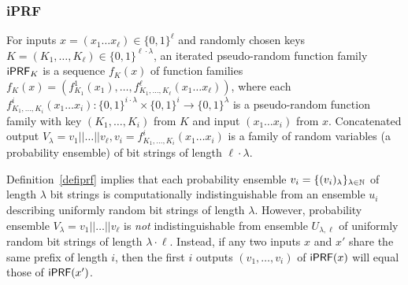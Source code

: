 \subsubsection{iPRF}
\begin{definition}[$\iprf$]\label{defiprf}
  For inputs $x=(x_1\ldots{}x_\ell)\in\{0,1\}^\ell$ and randomly
  chosen keys $K=(K_1,\ldots,K_\ell)\in\{0,1\}^{\ell\cdot\lambda}$, an
  iterated pseudo-random function family $\mathsf{i}\mathsf{PRF}_K$ is a sequence
  $f_K(x)$ of function families
  $f_K(x)=(f^1_{K_1}(x_{1}),\ldots,f^\ell_{K_1,\ldots,K_\ell}(x_{1}\ldots{}x_{\ell}))$,
  where each
  $f^i_{K_1,\ldots,K_i}(x_{1}\ldots{}x_{i}):\{0,1\}^{i\cdot\lambda}\times\{0,1\}^{i}\rightarrow{}\{0,1\}^\lambda$
  is a pseudo-random function family with key $(K_1,\ldots,K_i)$ from
  $K$ and input $(x_1\ldots{}x_i)$ from $x$. Concatenated output
  $V_\lambda=v_1||\ldots||v_\ell,v_i=f^i_{K_1,\ldots,K_i}(x_1\ldots{}x_i)$
  is a family of random variables (a probability ensemble) of bit
  strings of length $\ell\cdot\lambda$.

\end{definition}

Definition~\ref{defiprf} implies that each probability ensemble
$v_i=\{(v_i)_\lambda\}_{\lambda\in{\mathbb{N}}}$ of length $\lambda$ bit strings
is computationally indistinguishable from an ensemble $u_i$ describing
uniformly random bit strings of length $\lambda$. However, probability
ensemble $V_\lambda=v_1||\ldots||v_\ell$ is \emph{not}
indistinguishable from ensemble $U_{\lambda,\ell}$ of uniformly random
bit strings of length $\lambda\cdot\ell$. Instead, if any two inputs
$x$ and $x'$ share the same prefix of length $i$, then the first $i$
outputs $(v_1,\ldots,v_i)$ of $\mathsf{i}\mathsf{PRF}(x)$ will equal those of
$\mathsf{i}\mathsf{PRF}(x')$.  


